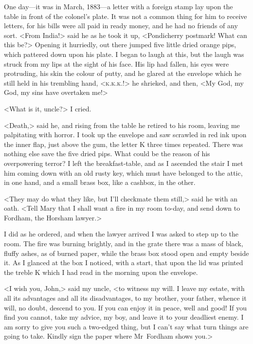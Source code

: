 One day—it was in March, 1883—a letter with a foreign stamp lay upon the table in front of the colonel's plate. It was not a common thing for him to receive letters, for his bills were all paid in ready money, and he had no friends of any sort. <From India!> said he as he took it up, <Pondicherry postmark! What can this be?> Opening it hurriedly, out there jumped five little dried orange pips, which pattered down upon his plate. I began to laugh at this, but the laugh was struck from my lips at the sight of his face. His lip had fallen, his eyes were protruding, his skin the colour of putty, and he glared at the envelope which he still held in his trembling hand, <\textsc{k.k.k.}!> he shrieked, and then, <My God, my God, my sins have overtaken me!>

<What is it, uncle?> I cried.

<Death,> said he, and rising from the table he retired to his room, leaving me palpitating with horror. I took up the envelope and saw scrawled in red ink upon the inner flap, just above the gum, the letter K three times repeated. There was nothing else save the five dried pips. What could be the reason of his overpowering terror? I left the breakfast-table, and as I ascended the stair I met him coming down with an old rusty key, which must have belonged to the attic, in one hand, and a small brass box, like a cashbox, in the other.

<They may do what they like, but I'll checkmate them still,> said he with an oath. <Tell Mary that I shall want a fire in my room to-day, and send down to Fordham, the Horsham lawyer.>

I did as he ordered, and when the lawyer arrived I was asked to step up to the room. The fire was burning brightly, and in the grate there was a mass of black, fluffy ashes, as of burned paper, while the brass box stood open and empty beside it. As I glanced at the box I noticed, with a start, that upon the lid was printed the treble K which I had read in the morning upon the envelope.

<I wish you, John,> said my uncle, <to witness my will. I leave my estate, with all its advantages and all its disadvantages, to my brother, your father, whence it will, no doubt, descend to you. If you can enjoy it in peace, well and good! If you find you cannot, take my advice, my boy, and leave it to your deadliest enemy. I am sorry to give you such a two-edged thing, but I can't say what turn things are going to take. Kindly sign the paper where Mr~Fordham shows you.>


